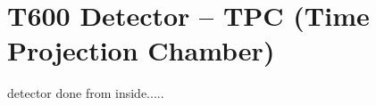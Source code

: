 \section{T600 Detector -- TPC (Time Projection Chamber)}
\label{sec:Detector}

detector done from inside.....



